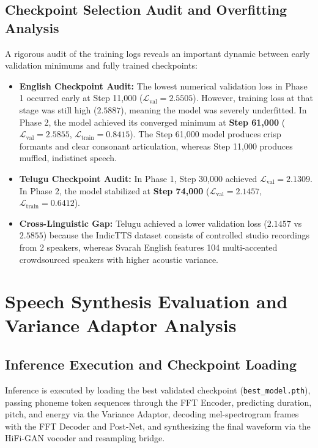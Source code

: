 \documentclass[11pt,a4paper]{article}
\begin{document}
\subsection{Checkpoint Selection Audit and Overfitting Analysis}
A rigorous audit of the training logs reveals an important dynamic between early validation minimums and fully trained checkpoints:
\begin{itemize}
    \item \textbf{English Checkpoint Audit:} The lowest numerical validation loss in Phase 1 occurred early at Step 11,000 ($\mathcal{L}_{\text{val}} = 2.5505$). However, training loss at that stage was still high ($2.5887$), meaning the model was severely underfitted. In Phase 2, the model achieved its converged minimum at \textbf{Step 61,000} ($\mathcal{L}_{\text{val}} = \mathbf{2.5855}$, $\mathcal{L}_{\text{train}} = 0.8415$). The Step 61,000 model produces crisp formants and clear consonant articulation, whereas Step 11,000 produces muffled, indistinct speech.
    \item \textbf{Telugu Checkpoint Audit:} In Phase 1, Step 30,000 achieved $\mathcal{L}_{\text{val}} = 2.1309$. In Phase 2, the model stabilized at \textbf{Step 74,000} ($\mathcal{L}_{\text{val}} = \mathbf{2.1457}$, $\mathcal{L}_{\text{train}} = 0.6412$).
    \item \textbf{Cross-Linguistic Gap:} Telugu achieved a lower validation loss ($2.1457$ vs $2.5855$) because the IndicTTS dataset consists of controlled studio recordings from 2 speakers, whereas Svarah English features 104 multi-accented crowdsourced speakers with higher acoustic variance.
\end{itemize}

\section{Speech Synthesis Evaluation and Variance Adaptor Analysis}

\subsection{Inference Execution and Checkpoint Loading}
Inference is executed by loading the best validated checkpoint (\texttt{best\_model.pth}), passing phoneme token sequences through the FFT Encoder, predicting duration, pitch, and energy via the Variance Adaptor, decoding mel-spectrogram frames with the FFT Decoder and Post-Net, and synthesizing the final waveform via the HiFi-GAN vocoder and resampling bridge.
\end{document}
